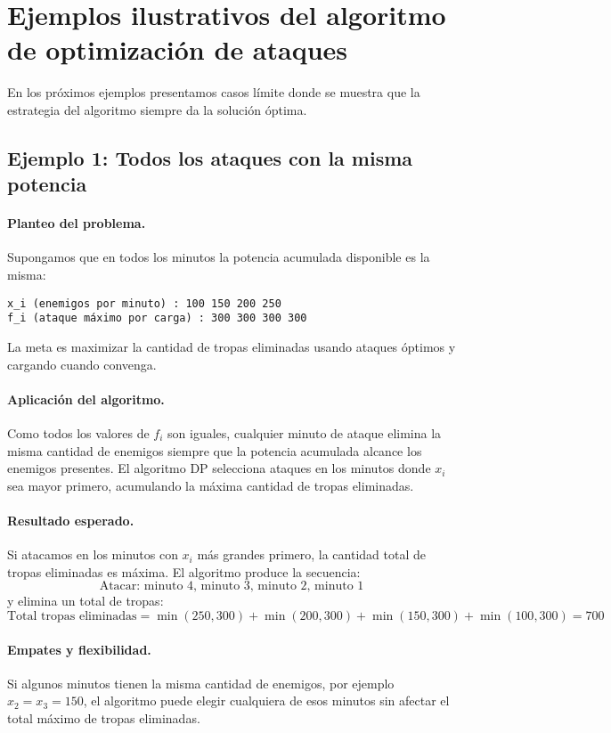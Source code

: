 \section{Ejemplos ilustrativos del algoritmo de optimización de ataques}

En los próximos ejemplos presentamos casos límite donde se muestra que la estrategia del algoritmo siempre da la solución óptima.

\subsection{Ejemplo 1: Todos los ataques con la misma potencia}

\paragraph{Planteo del problema.}  
Supongamos que en todos los minutos la potencia acumulada disponible es la misma:
\begin{verbatim}
x_i (enemigos por minuto) : 100 150 200 250
f_i (ataque máximo por carga) : 300 300 300 300
\end{verbatim}
La meta es maximizar la cantidad de tropas eliminadas usando ataques óptimos y cargando cuando convenga.

\paragraph{Aplicación del algoritmo.}  
Como todos los valores de $f_i$ son iguales, cualquier minuto de ataque elimina la misma cantidad de enemigos siempre que la potencia acumulada alcance los enemigos presentes.  
El algoritmo DP selecciona ataques en los minutos donde $x_i$ sea mayor primero, acumulando la máxima cantidad de tropas eliminadas.

\paragraph{Resultado esperado.}  
Si atacamos en los minutos con $x_i$ más grandes primero, la cantidad total de tropas eliminadas es máxima.  
El algoritmo produce la secuencia:
\[
\text{Atacar: minuto 4, minuto 3, minuto 2, minuto 1}
\]
y elimina un total de tropas:
\[
\text{Total tropas eliminadas} = \min(250,300) + \min(200,300) + \min(150,300) + \min(100,300) = 700
\]

\paragraph{Empates y flexibilidad.}  
Si algunos minutos tienen la misma cantidad de enemigos, por ejemplo $x_2 = x_3 = 150$, el algoritmo puede elegir cualquiera de esos minutos sin afectar el total máximo de tropas eliminadas.

